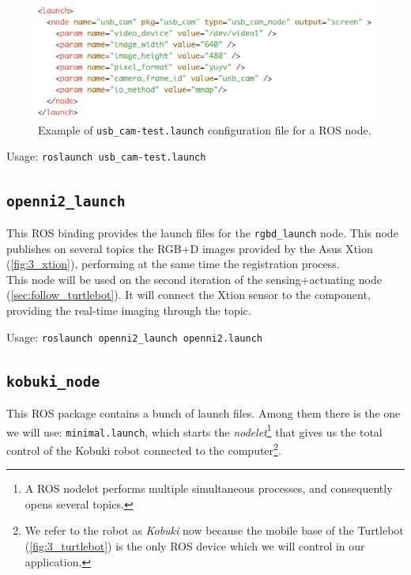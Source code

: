 		\begin{figure}[h]
			\centering
			\includegraphics[width=5in]{images/usb_cam_test}
			\caption{Example of \texttt{usb\_cam-test.launch} configuration file for a ROS node.}
			\label{fig:3_launch_file}
		\end{figure}
		\begin{center}
			Usage: \texttt{roslaunch usb\_cam-test.launch}
		\end{center}

	\subsection{\texttt{openni2\_launch}}
		This ROS binding \cite{openni2-doc} provides the launch files for the \texttt{rgbd\_launch} node. This node publishes on several topics the RGB+D images provided by the Asus Xtion (\autoref{fig:3_xtion}), performing at the same time the registration process.\\
		
		This node will be used on the second iteration of the sensing+actuating node (\autoref{sec:follow_turtlebot}). It will connect the Xtion sensor to the component, providing the real-time imaging through the topic.\\

		\begin{center}
			Usage: \texttt{roslaunch openni2\_launch openni2.launch}
		\end{center}
		

	\subsection{\texttt{kobuki\_node}}
		This ROS package contains a bunch of launch files. Among them there is the one we will use: \texttt{minimal.launch}, which starts the \emph{nodelet}\footnote{A ROS nodelet performs multiple simultaneous processes, and consequently opens several topics.} that gives us the total control of the Kobuki robot connected to the computer\footnote{We refer to the robot as \emph{Kobuki} now because the mobile base of the Turtlebot (\autoref{fig:3_turtlebot}) is the only ROS device which we will control in our application.}.\\
		
